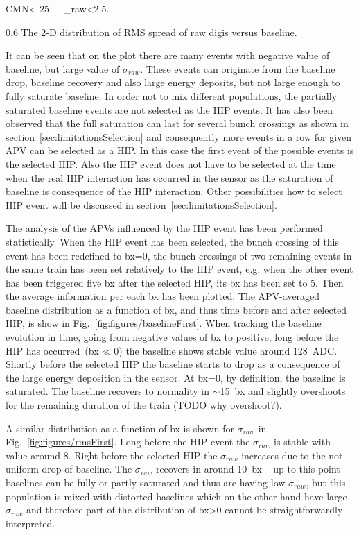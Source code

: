 {
CMN<-25~~~\sigma_{raw}<2.5.
}

                 {0.6}       %
                 {The 2-D distribution of RMS spread of raw digis versus baseline. } %

It can be seen that on the plot there are many events with negative value of baseline, but large value of $\sigma_{raw}$. These events can originate from the baseline drop, baseline recovery and also large energy deposits, but not large enough to fully saturate baseline. In order not to mix different populations, the partially saturated baseline events are not selected as the HIP events. It has also been observed that the full saturation can last for several bunch crossings as shown in section~\ref{sec:limitationsSelection} and consequently more events in a row for given APV can be selected as a HIP. In this case the first event of the possible events is the selected HIP. Also the HIP event does not have to be selected at the time when the real HIP interaction has occurred in the sensor as the saturation of baseline is consequence of the HIP interaction. Other possibilities how to select HIP event will be discussed in section~\ref{sec:limitationsSelection}.

The analysis of the APVs influenced by the HIP event has been performed statistically. When the HIP event has been selected, the bunch crossing of this event has been redefined to bx=0, the bunch crossings of two remaining events in the same train has been set relatively to the HIP event, e.g. when the other event has been triggered five bx after the selected HIP, its bx has been set to 5. Then the average information per each bx has been plotted. The APV-averaged baseline distribution as a function of bx, and thus time before and after selected HIP, is show in Fig.~\ref{fig:figures/baselineFirst}. When tracking the baseline evolution in time, going from negative values of bx to positive, long before the HIP has occurred~(bx$\ll$0) the baseline shows stable value around 128~ADC. Shortly before the selected HIP the baseline starts to drop as a consequence of the large energy deposition in the sensor. At bx=0, by definition, the baseline is saturated. The baseline recovers to normality in $\sim$15~bx and slightly overshoots for the remaining duration of the train (TODO why overshoot?).

A similar distribution as a function of bx is shown for $\sigma_{raw}$ in Fig.~\ref{fig:figures/rmsFirst}. Long before the HIP event the $\sigma_{raw}$ is stable with value around 8. Right before the selected HIP the $\sigma_{raw}$ increases due to the not uniform drop of baseline. The $\sigma_{raw}$ recovers in around 10~bx --  up to this point baselines can be fully or partly saturated and thus are having low $\sigma_{raw}$, but this population is mixed with distorted baselines which on the other hand have large $\sigma_{raw}$ and therefore part of the distribution of bx>0 cannot be straightforwardly interpreted.


